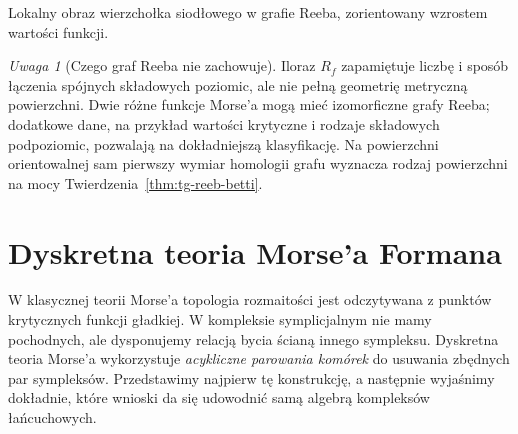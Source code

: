 \documentclass[11pt,a4paper]{report}
\numberwithin{equation}{section}
\theoremstyle{plain}
\theoremstyle{definition}
\theoremstyle{remark}
\newtheorem{uwaga}[twierdzenie]{Uwaga}
\begin{document}
\begin{samepage}
\begin{center}
\begin{minipage}{.96\linewidth}\centering
{}\par\smallskip

{\footnotesize Lokalny obraz wierzchołka siodłowego
w grafie Reeba, zorientowany wzrostem wartości funkcji.}
\end{minipage}
\end{center}
\end{samepage}

\begin{uwaga}[Czego graf Reeba nie zachowuje]
Iloraz $R_f$ zapamiętuje liczbę i sposób łączenia
spójnych składowych poziomic, ale nie pełną geometrię
metryczną powierzchni. Dwie różne funkcje Morse'a
mogą mieć izomorficzne grafy Reeba; dodatkowe dane,
na przykład wartości krytyczne i rodzaje składowych
podpoziomic, pozwalają na dokładniejszą klasyfikację.
Na powierzchni orientowalnej sam pierwszy wymiar homologii
grafu wyznacza rodzaj powierzchni na mocy
Twierdzenia~\ref{thm:tg-reeb-betti}.
\end{uwaga}

\chapter{Dyskretna teoria Morse'a Formana}
\label{ch:tg-forman}

W klasycznej teorii Morse'a topologia rozmaitości jest
odczytywana z punktów krytycznych funkcji gładkiej.
W kompleksie symplicjalnym nie mamy pochodnych,
ale dysponujemy relacją bycia ścianą innego sympleksu.
Dyskretna teoria Morse'a wykorzystuje \emph{acykliczne
parowania komórek} do usuwania zbędnych par sympleksów.
Przedstawimy najpierw tę konstrukcję, a następnie
wyjaśnimy dokładnie, które wnioski da się udowodnić
samą algebrą kompleksów łańcuchowych.
\end{document}
